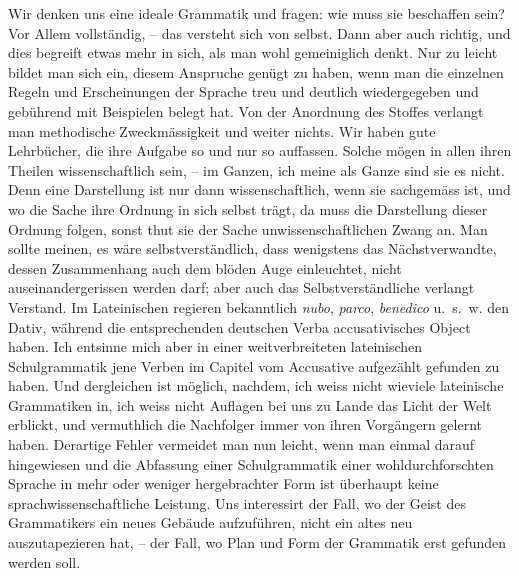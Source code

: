 \largerpage
Wir denken uns eine ideale Grammatik und fragen: wie muss sie beschaffen sein? Vor Allem vollständig, – das versteht sich von selbst. Dann aber auch richtig, und dies begreift etwas mehr in sich, als man wohl gemeiniglich denkt. Nur zu leicht bildet man sich ein, diesem Anspruche genügt zu haben, wenn man die einzelnen Regeln und Erscheinungen der Sprache treu und deutlich wiedergegeben und gebührend mit Beispielen belegt hat. Von der Anordnung des Stoffes verlangt man methodische Zweckmässigkeit und weiter nichts. Wir haben gute Lehrbücher, die ihre Aufgabe so und nur so auffassen. Solche \label{sp.82} mögen in allen ihren Theilen wissenschaftlich sein, – im Ganzen, ich meine als Ganze sind sie es nicht. Denn eine Darstellung ist nur dann wissenschaftlich, wenn sie sachgemäss ist, und wo die Sache ihre Ordnung in sich selbst trägt, da muss die Darstellung dieser Ordnung folgen, sonst thut sie der Sache unwissenschaftlichen Zwang an. Man sollte meinen, es wäre selbstverständlich, dass wenigstens das Nächstverwandte, dessen Zusammenhang auch dem blöden Auge einleuchtet, nicht auseinandergerissen werden darf; aber auch das Selbstverständliche verlangt Verstand. Im Lateinischen regieren bekanntlich \textit{nubo}, \textit{parco}, \textit{benedico} u.~s.~w. den Dativ, während die entsprechenden deutschen Verba accusativisches Object haben. Ich entsinne mich aber in einer weitverbreiteten lateinischen Schulgrammatik jene Verben im Capitel vom Accusative aufgezählt gefunden zu haben. Und dergleichen ist möglich, nachdem, ich weiss nicht wieviele lateinische Grammatiken in, ich weiss nicht  Auflagen bei uns zu Lande das Licht der Welt erblickt, und vermuthlich die Nachfolger immer von ihren Vorgängern gelernt haben. Derartige Fehler vermeidet man nun leicht, wenn man einmal darauf hingewiesen  und die Abfassung einer Schulgrammatik einer wohldurchforschten Sprache in mehr oder weniger hergebrachter Form ist überhaupt keine sprachwissenschaftliche Leistung. Uns interessirt der Fall, \label{fp.84} wo der Geist des Grammatikers ein neues Gebäude aufzuführen, nicht  ein altes neu auszutapezieren hat, – der Fall, wo Plan und Form der Grammatik erst gefunden werden soll.

